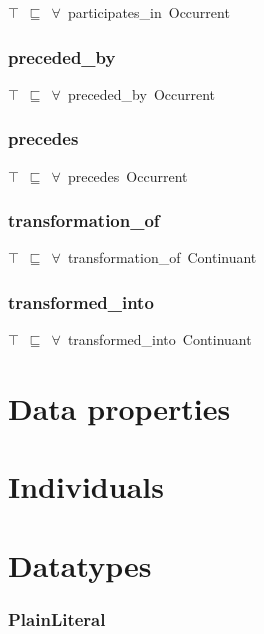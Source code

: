 \documentclass{article}
\begin{document}
\ensuremath{\top}~\ensuremath{\sqsubseteq}~\ensuremath{\forall}~participates\_in~Occurrent

\subsubsection*{preceded_by}

\ensuremath{\top}~\ensuremath{\sqsubseteq}~\ensuremath{\forall}~preceded\_by~Occurrent

\subsubsection*{precedes}

\ensuremath{\top}~\ensuremath{\sqsubseteq}~\ensuremath{\forall}~precedes~Occurrent

\subsubsection*{transformation_of}

\ensuremath{\top}~\ensuremath{\sqsubseteq}~\ensuremath{\forall}~transformation\_of~Continuant

\subsubsection*{transformed_into}

\ensuremath{\top}~\ensuremath{\sqsubseteq}~\ensuremath{\forall}~transformed\_into~Continuant

\section*{Data properties}\section*{Individuals}\section*{Datatypes}\subsubsection*{PlainLiteral}
\end{document}

